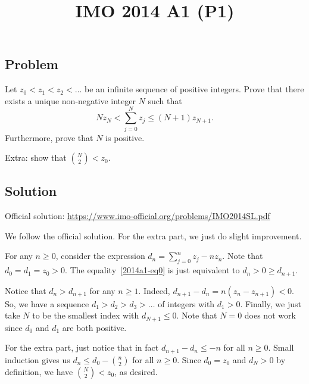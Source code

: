 \documentclass{article}
\title{IMO 2014 A1 (P1)}
\author{}
\date{}
\begin{document}
\maketitle



\subsection*{Problem}

Let $z_0 < z_1 < z_2 < \ldots$ be an infinite sequence of positive integers.
Prove that there exists a unique non-negative integer $N$ such that
\[ N z_N < \sum_{j = 0}^N z_j \leq (N + 1) z_{N + 1}. \tag{*}\label{2014a1-eq0} \]
Furthermore, prove that $N$ is positive.

Extra: show that $\binom{N}{2} < z_0$.



\subsection*{Solution}

Official solution: \url{https://www.imo-official.org/problems/IMO2014SL.pdf}

We follow the official solution.
For the extra part, we just do slight improvement.

For any $n \geq 0$, consider the expression $d_n = \sum_{j = 0}^n z_j - n z_n$.
Note that $d_0 = d_1 = z_0 > 0$.
The equality~\eqref{2014a1-eq0} is just equivalent to $d_n > 0 \geq d_{n + 1}$.

Notice that $d_n > d_{n + 1}$ for any $n \geq 1$.
Indeed, $d_{n + 1} - d_n = n (z_n - z_{n + 1}) < 0$.
So, we have a sequence $d_1 > d_2 > d_3 > \ldots$ of integers with $d_1 > 0$.
Finally, we just take $N$ to be the smallest index with $d_{N + 1} \leq 0$.
Note that $N = 0$ does not work since $d_0$ and $d_1$ are both positive.

For the extra part, just notice that in fact $d_{n + 1} - d_n \leq -n$ for all $n \geq 0$.
Small induction gives us $d_n \leq d_0 - \binom{n}{2}$ for all $n \geq 0$.
Since $d_0 = z_0$ and $d_N > 0$ by definition, we have $\binom{N}{2} < z_0$, as desired.
\end{document}
